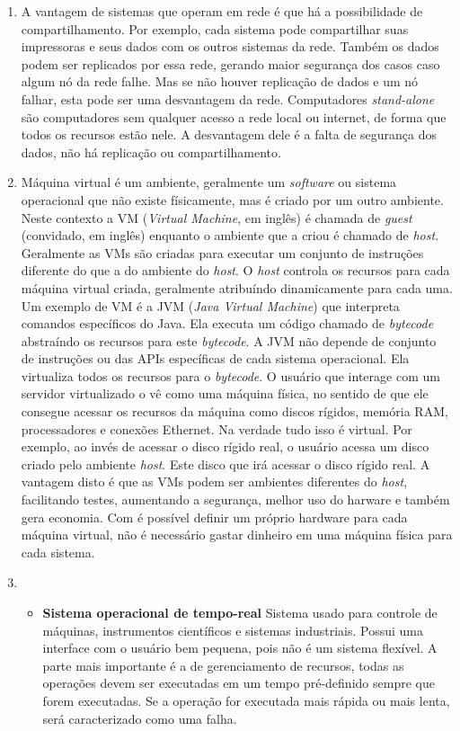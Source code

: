 \documentclass[12pt,a4paper]{article}
\begin{document}
\begin{enumerate}
\item
A vantagem de sistemas que operam em rede é que há a possibilidade de 
compartilhamento. Por exemplo, cada sistema pode compartilhar suas impressoras
e seus dados com os outros sistemas da rede. Também os dados podem ser 
replicados por essa rede, gerando maior segurança dos casos caso algum nó
da rede falhe. Mas se não houver replicação de dados e um nó falhar, esta
pode ser uma desvantagem da rede.
Computadores \textsl{stand-alone} são computadores sem qualquer acesso a
rede local ou internet, de forma que todos os recursos estão nele. A 
desvantagem dele é a falta de segurança dos dados, não há replicação ou
compartilhamento.

\item
Máquina virtual é um ambiente, geralmente um \textsl{software} ou sistema 
operacional que não existe físicamente, mas é criado por um outro ambiente.
Neste contexto a VM (\textsl{Virtual Machine}, em inglês) é chamada de 
\textsl{guest} (convidado, em inglês) enquanto o ambiente que a criou é
chamado de \textsl{host}. Geralmente as VMs são criadas para
executar um conjunto de instruções diferente do que a do ambiente do 
\textsl{host}. O \textsl{host} controla os recursos para cada máquina virtual
criada, geralmente atribuíndo dinamicamente para cada uma. Um exemplo de
VM é a JVM (\textsl{Java Virtual Machine}) que interpreta comandos específicos
do Java. Ela executa um código chamado de \textsl{bytecode} abstraíndo os
recursos para este \textsl{bytecode}. A JVM não depende de conjunto de 
instruções ou das APIs específicas de cada sistema operacional. Ela virtualiza
todos os recursos para o \textsl{bytecode}.
O usuário que interage com um servidor virtualizado o vê como uma máquina
física, no sentido de que ele consegue acessar os recursos da máquina como
discos rígidos, memória RAM, processadores e conexões Ethernet. Na verdade
tudo isso é virtual. Por exemplo, ao invés de acessar o disco rígido real, o
usuário acessa um disco criado pelo ambiente \textsl{host}. Este disco que 
irá acessar o disco rígido real.
A vantagem disto é que as VMs podem ser ambientes diferentes do \textsl{host},
facilitando testes, aumentando a segurança, melhor uso do harware e também 
gera economia. Com é possível definir um próprio hardware para cada máquina
virtual, não é necessário gastar dinheiro em uma máquina física para cada
sistema.

\item
\begin{itemize}
\item \textbf{Sistema operacional de tempo-real} Sistema usado para controle de 
máquinas, instrumentos científicos e sistemas industriais. Possui uma
interface com o usuário bem pequena, pois não é um sistema flexível. A parte
mais importante é a de gerenciamento de recursos, todas as operações devem
ser executadas em um tempo pré-definido sempre que forem executadas. Se a 
operação for executada mais rápida ou mais lenta, será caracterizado como uma
falha.


\end{itemize}
\end{enumerate}
\end{document}
